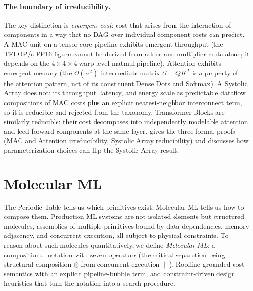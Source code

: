 \documentclass[10pt,twocolumn]{article}
\newcommand{\cvalint}[1]{\pgfmathprintnumber[fixed, precision=0, 1000 sep={\,}]{#1}}
\begin{document}
\paragraph{The boundary of irreducibility.} The key distinction is \emph{emergent cost}: cost that arises from the interaction of components in a way that no DAG over individual component costs can predict. A MAC unit on a tensor-core pipeline exhibits emergent throughput (the \cvalint{\HhPeakTFLOPS}\,TFLOP/s FP16 figure cannot be derived from adder and multiplier costs alone; it depends on the $4{\times}4{\times}4$ warp-level matmul pipeline). Attention exhibits emergent memory (the $O(n^2)$ intermediate matrix $S = QK^T$ is a property of the attention pattern, not of its constituent Dense Dots and Softmax). A Systolic Array does not: its throughput, latency, and energy scale as predictable dataflow compositions of MAC costs plus an explicit nearest-neighbor interconnect term, so it is reducible and rejected from the taxonomy. Transformer Blocks are similarly reducible: their cost decomposes into independently modelable attention and feed-forward components at the same layer.  gives the three formal proofs (MAC and Attention irreducibility, Systolic Array reducibility) and discusses how parameterization choices can flip the Systolic Array result.

\section{Molecular ML}
\label{sec:composition}

The Periodic Table tells us which primitives exist; Molecular ML tells us how to compose them. Production ML systems are not isolated elements but structured molecules, assemblies of multiple primitives bound by data dependencies, memory adjacency, and concurrent execution, all subject to physical constraints. To reason about such molecules quantitatively, we define \emph{Molecular ML}: a compositional notation with seven operators (the critical separation being structural composition $\otimes$ from concurrent execution $\parallel$), Roofline-grounded cost semantics with an explicit pipeline-bubble term, and constraint-driven design heuristics that turn the notation into a search procedure.
\end{document}
